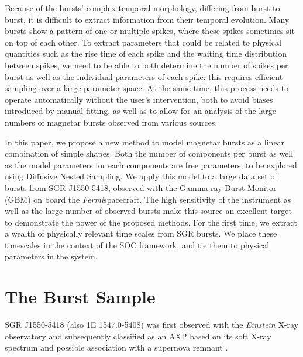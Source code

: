 \documentclass[12pt]{emulateapj}
\newcommand{\project}[1]{\textsl{#1}}
\newcommand{\fermi}{\project{Fermi}}
\begin{document}
Because of the bursts' complex temporal morphology, differing from burst to burst, it is difficult to extract information from their temporal evolution. 
Many bursts show a pattern of one or multiple spikes, where these spikes sometimes sit on top of each other. To extract parameters that could be related
to physical quantities such as the rise time of each spike and the waiting time distribution between spikes, we need to be able to both determine the 
number of spikes per burst as well as the individual parameters of each spike: this requires efficient sampling over a large parameter space.
At the same time, this process needs to operate automatically without the user's intervention, both to avoid biases introduced by manual fitting, as well as
 to allow for an analysis of the large numbers of magnetar bursts observed from various sources.

In this paper, we propose a new method to model magnetar bursts as a linear combination of simple shapes. Both the number of components
per burst as well as the model parameters for each components are free parameters, to be explored using Diffusive Nested Sampling.
We apply this model to a large data set of bursts from SGR J1550-5418, observed with the Gamma-ray Burst Monitor (GBM) on board the \fermi spacecraft.
The high sensitivity of the instrument as well as 
the large number of observed bursts make this source an excellent target to demonstrate the power of the proposed methods. For the first time, 
we extract a wealth of physically relevant time scales from SGR bursts. 
We place these timescales in the context of the SOC framework, and tie them to physical parameters in the system.



\section{The Burst Sample}

SGR J1550-5418 (also 1E 1547.0-5408) was first observed with the {\it Einstein} X-ray observatory \citep{lamb1981}
and subsequently classified as an AXP based on its soft X-ray spectrum and possible association with a supernova remnant \citep{gelfand2007}.
\end{document}
